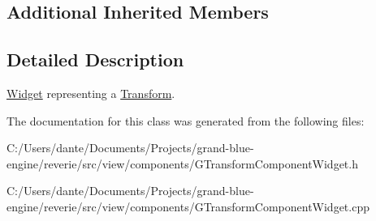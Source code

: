 \subsection*{Additional Inherited Members}


\subsection{Detailed Description}
\mbox{\hyperlink{class_widget}{Widget}} representing a \mbox{\hyperlink{classrev_1_1_transform}{Transform}}. 

The documentation for this class was generated from the following files\+:\begin{DoxyCompactItemize}
\item 
C\+:/\+Users/dante/\+Documents/\+Projects/grand-\/blue-\/engine/reverie/src/view/components/G\+Transform\+Component\+Widget.\+h\item 
C\+:/\+Users/dante/\+Documents/\+Projects/grand-\/blue-\/engine/reverie/src/view/components/G\+Transform\+Component\+Widget.\+cpp\end{DoxyCompactItemize}
